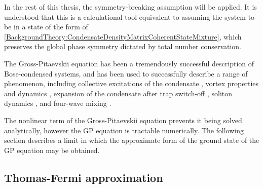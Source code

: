 In the rest of this thesis, the symmetry-breaking assumption will be applied.  It is understood that this is a calculational tool equivalent to assuming the system to be in a state of the form of \eqref{BackgroundTheory:CondensateDensityMatrixCoherentStateMixture}, which preserves the global phase symmetry dictated by total number conservation.

\parasep

The Gross-Pitaevskii equation has been a tremendously successful description of Bose-condensed systems, and has been used to successfully describe a range of phenomenon, including collective excitations of the condensate \citep{Ruprecht:1996,Edwards:1996}, vortex properties and dynamics \citep{Dalfovo:1996,Edwards:1996a,Caradoc-Davies:1999,Caradoc-Davies:2000qy}, expansion of the condensate after trap switch-off \citep{Dalfovo:1997lr}, soliton dynamics \citep{Burger:1999eu}, and four-wave mixing \citep{Deng:1999qy}.  

The nonlinear term of the Gross-Pitaevskii equation prevents it being solved analytically, however the GP equation is tractable numerically.  The following section describes a limit in which the approximate form of the ground state of the GP equation may be obtained.

\subsection{Thomas-Fermi approximation}

